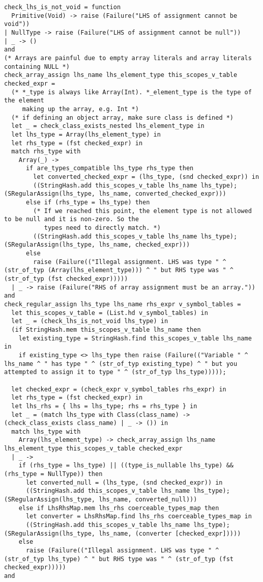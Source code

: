 \documentclass{article}
\begin{document}
\begin{verbatim}
check_lhs_is_not_void = function
  Primitive(Void) -> raise (Failure("LHS of assignment cannot be void"))
| NullType -> raise (Failure("LHS of assignment cannot be null"))
| _ -> ()
and
(* Arrays are painful due to empty array literals and array literals containing NULL *)
check_array_assign lhs_name lhs_element_type this_scopes_v_table checked_expr =
  (* *_type is always like Array(Int). *_element_type is the type of the element
     making up the array, e.g. Int *)
  (* if defining an object array, make sure class is defined *)
  let _ = check_class_exists_nested lhs_element_type in
  let lhs_type = Array(lhs_element_type) in
  let rhs_type = (fst checked_expr) in
  match rhs_type with
    Array(_) ->
      if are_types_compatible lhs_type rhs_type then
        let converted_checked_expr = (lhs_type, (snd checked_expr)) in
        ((StringHash.add this_scopes_v_table lhs_name lhs_type); (SRegularAssign(lhs_type, lhs_name, converted_checked_expr)))
      else if (rhs_type = lhs_type) then
        (* If we reached this point, the element type is not allowed to be null and it is non-zero. So the
           types need to directly match. *)
        ((StringHash.add this_scopes_v_table lhs_name lhs_type); (SRegularAssign(lhs_type, lhs_name, checked_expr)))
      else
        raise (Failure(("Illegal assignment. LHS was type " ^ (str_of_typ (Array(lhs_element_type))) ^ " but RHS type was " ^ (str_of_typ (fst checked_expr)))))
  | _ -> raise (Failure("RHS of array assignment must be an array."))
and
check_regular_assign lhs_type lhs_name rhs_expr v_symbol_tables =
  let this_scopes_v_table = (List.hd v_symbol_tables) in
  let _ = (check_lhs_is_not_void lhs_type) in
  (if StringHash.mem this_scopes_v_table lhs_name then
    let existing_type = StringHash.find this_scopes_v_table lhs_name in
    if existing_type <> lhs_type then raise (Failure(("Variable " ^ lhs_name ^ " has type " ^ (str_of_typ existing_type) ^ " but you attempted to assign it to type " ^ (str_of_typ lhs_type)))));

  let checked_expr = (check_expr v_symbol_tables rhs_expr) in
  let rhs_type = (fst checked_expr) in
  let lhs_rhs = { lhs = lhs_type; rhs = rhs_type } in
  let _ = (match lhs_type with Class(class_name) -> (check_class_exists class_name) | _ -> ()) in
  match lhs_type with
    Array(lhs_element_type) -> check_array_assign lhs_name lhs_element_type this_scopes_v_table checked_expr
  | _ ->
    if (rhs_type = lhs_type) || ((type_is_nullable lhs_type) && (rhs_type = NullType)) then
      let converted_null = (lhs_type, (snd checked_expr)) in
      ((StringHash.add this_scopes_v_table lhs_name lhs_type); (SRegularAssign(lhs_type, lhs_name, converted_null)))
    else if LhsRhsMap.mem lhs_rhs coerceable_types_map then
      let converter = LhsRhsMap.find lhs_rhs coerceable_types_map in
      ((StringHash.add this_scopes_v_table lhs_name lhs_type); (SRegularAssign(lhs_type, lhs_name, (converter [checked_expr]))))
    else
      raise (Failure(("Illegal assignment. LHS was type " ^ (str_of_typ lhs_type) ^ " but RHS type was " ^ (str_of_typ (fst checked_expr)))))
and


\end{verbatim}
\end{document}
